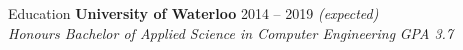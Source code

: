 \documentclass{resume} %
\begin{document}

\begin{rSection}{Education}
  {\bf University of Waterloo} \hfill {2014 -- 2019 \em (expected)} \\
  {\em Honours Bachelor of Applied Science in Computer Engineering} \hfill {\em GPA 3.7}
\end{rSection}
\end{document}

